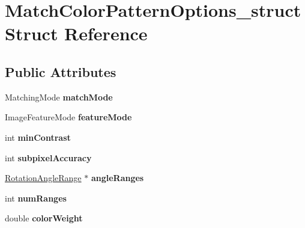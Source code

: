 \hypertarget{structMatchColorPatternOptions__struct}{
\section{MatchColorPatternOptions\_\-struct Struct Reference}
\label{structMatchColorPatternOptions__struct}
}
\subsection*{Public Attributes}
\begin{DoxyCompactItemize}
\item 
\hypertarget{structMatchColorPatternOptions__struct_ae733ca4271c6dca38c5f2689f0a511b1}{
MatchingMode {\bfseries matchMode}}
\label{structMatchColorPatternOptions__struct_ae733ca4271c6dca38c5f2689f0a511b1}

\item 
\hypertarget{structMatchColorPatternOptions__struct_abd2ebed8e431bdc3ca92a05a3b2e029e}{
ImageFeatureMode {\bfseries featureMode}}
\label{structMatchColorPatternOptions__struct_abd2ebed8e431bdc3ca92a05a3b2e029e}

\item 
\hypertarget{structMatchColorPatternOptions__struct_aa265353757eeadb6ab1c4f8da5f08e6d}{
int {\bfseries minContrast}}
\label{structMatchColorPatternOptions__struct_aa265353757eeadb6ab1c4f8da5f08e6d}

\item 
\hypertarget{structMatchColorPatternOptions__struct_add97f122cfb0ab2e416d7dbe8af287ca}{
int {\bfseries subpixelAccuracy}}
\label{structMatchColorPatternOptions__struct_add97f122cfb0ab2e416d7dbe8af287ca}

\item 
\hypertarget{structMatchColorPatternOptions__struct_a57d2ec55e6f06440baa4e5e2d65a93e3}{
\hyperlink{structRotationAngleRange__struct}{RotationAngleRange} $\ast$ {\bfseries angleRanges}}
\label{structMatchColorPatternOptions__struct_a57d2ec55e6f06440baa4e5e2d65a93e3}

\item 
\hypertarget{structMatchColorPatternOptions__struct_ae6fad0a0b1484d03edfdbc58fad3acc1}{
int {\bfseries numRanges}}
\label{structMatchColorPatternOptions__struct_ae6fad0a0b1484d03edfdbc58fad3acc1}

\item 
\hypertarget{structMatchColorPatternOptions__struct_a0bec234b3614423bcf22086ba6a1927e}{
double {\bfseries colorWeight}}
\label{structMatchColorPatternOptions__struct_a0bec234b3614423bcf22086ba6a1927e}


\end{DoxyCompactItemize}
